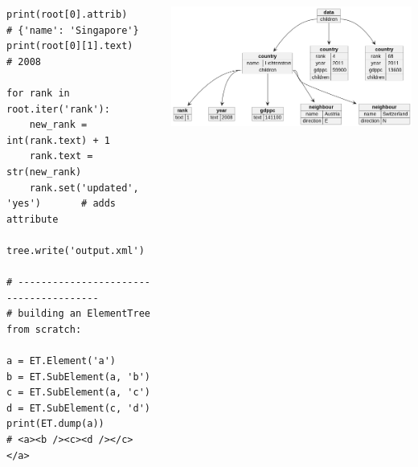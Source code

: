 \begin{frame}[fragile]
%
\vspace{-0.7cm}
\begin{columns}
\begin{codebox}[... continued]
\begin{verbatim}
print(root[0].attrib)                # {'name': 'Singapore'}
print(root[0][1].text)               # 2008

for rank in root.iter('rank'):
    new_rank = int(rank.text) + 1
    rank.text = str(new_rank)
    rank.set('updated', 'yes')       # adds attribute

tree.write('output.xml')

# ---------------------------------------
# building an ElementTree from scratch:

a = ET.Element('a')
b = ET.SubElement(a, 'b')
c = ET.SubElement(a, 'c')
d = ET.SubElement(c, 'd')
print(ET.dump(a))
# <a><b /><c><d /></c></a>
\end{verbatim}
\end{codebox}
%
\vspace{1cm}
\includegraphics[width=\linewidth, trim={2cm 2cm 12cm 2cm}, clip]{./gfx/22-xml-countries}
\end{columns}
%
\end{frame}



